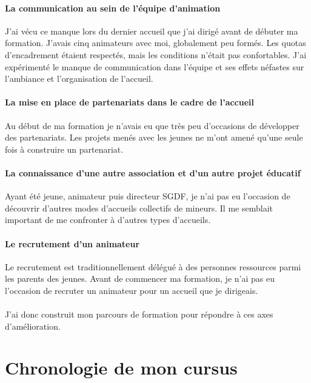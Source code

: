 \documentclass[titlepage,11pt,a4paper]{article}
\begin{document}
\label{analysepersonnelle}
\paragraph{La communication au sein de l'équipe d'animation} J'ai vécu ce manque lors du
dernier accueil que j'ai dirigé avant de débuter ma formation. J'avais cinq animateurs avec moi,
globalement peu formés. Les quotas d'encadrement étaient respectés, mais les conditions
n'était pas confortables. J'ai expérimenté le manque de communication dans l'équipe et ses
effets néfastes sur l'ambiance et l'organisation de l'accueil.

\paragraph{La mise en place de partenariats dans le cadre de l'accueil} Au début de ma
formation je n'avais eu que très peu d'occasions de développer des partenariats. Les
projets menés avec les jeunes ne m'ont amené qu'une seule fois à construire un
partenariat.

\paragraph{La connaissance d'une autre association et d'un autre projet éducatif} Ayant
été jeune, animateur puis directeur SGDF, je n'ai pas eu l'occasion de découvrir d'autres
modes d'accueils collectifs de mineurs. Il me semblait important de me confronter à
d'autres types d'accueils.

\paragraph{Le recrutement d'un animateur} Le recrutement est traditionnellement délégué à
des personnes ressources parmi les parents des jeunes. Avant de commencer ma formation, je
n'ai pas eu l'occasion de recruter un animateur pour un accueil que je dirigeais.

\paragraph{} J'ai donc construit mon parcours de formation pour répondre à ces axes d'amélioration.


\clearpage
\section{Chronologie de mon cursus}
\end{document}
